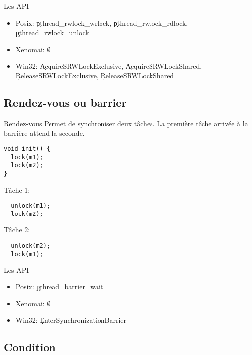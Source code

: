 \begin{frame}[fragile=singleslide]{Les API}
  \begin{itemize}
  \item  Posix:  \c{pthread_rwlock_wrlock}, \c{pthread_rwlock_rdlock},
    \c{pthread_rwlock_unlock}
  \item Xenomai: $\emptyset$
  \item  Win32: \c{AcquireSRWLockExclusive}, \c{AcquireSRWLockShared},
    \c{ReleaseSRWLockExclusive}, \c{ReleaseSRWLockShared}
  \end{itemize}
\end{frame}

\subsection{Rendez-vous ou barrier}
\begin{frame}[fragile]{Rendez-vous}
  Permet de synchroniser  deux tâches. La première tâche  arrivée à la
  barrière attend la seconde.
\begin{lstlisting}
void init() {
  lock(m1);
  lock(m2);
}
\end{lstlisting}
Tâche 1:
\begin{lstlisting}
  unlock(m1);
  lock(m2);
\end{lstlisting}
Tâche 2:
\begin{lstlisting}
  unlock(m2);
  lock(m1);
\end{lstlisting}
\end{frame}

\begin{frame}[fragile=singleslide]{Les API}
  \begin{itemize}
  \item Posix: \c{pthread_barrier_wait}
  \item Xenomai: $\emptyset$
  \item Win32: \c{EnterSynchronizationBarrier}
  \end{itemize}
\end{frame}

\subsection{Condition}

